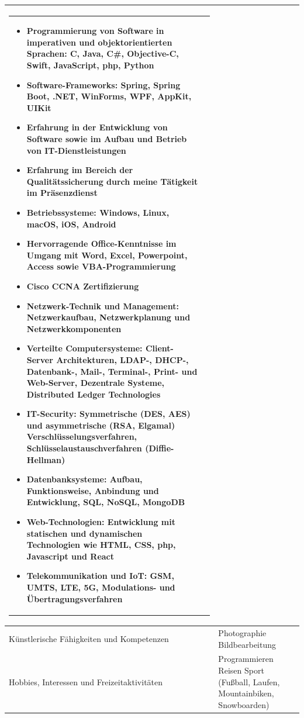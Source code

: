 \begin{longtable}{p{}|p{}}
\begin{tabular} {m{} m{} }
	\begin{itemize}[nosep,leftmargin=1em]
	\item Programmierung von Software in imperativen und objektorientierten Sprachen: C, Java, C\#, Objective-C, Swift, JavaScript, php, Python
	\item Software-Frameworks: Spring, Spring Boot, .NET, WinForms, WPF, AppKit, UIKit
	\item Erfahrung in der Entwicklung von Software sowie im Aufbau und Betrieb von IT-Dienstleistungen
	\item Erfahrung im Bereich der Qualitätssicherung durch meine Tätigkeit im Präsenzdienst
	\item Betriebssysteme: Windows, Linux, macOS, iOS, Android
	\item Hervorragende Office-Kenntnisse im Umgang mit Word, Excel, Powerpoint, Access sowie VBA-Programmierung
	\item Cisco CCNA Zertifizierung
	\item Netzwerk-Technik und Management: Netzwerkaufbau, Netzwerkplanung und Netzwerkkomponenten
	\item Verteilte Computersysteme: Client-Server Architekturen, LDAP-, DHCP-, Datenbank-, Mail-, Terminal-, Print- und Web-Server, Dezentrale Systeme, Distributed Ledger Technologies
	\item IT-Security: Symmetrische (DES, AES) und asymmetrische (RSA, Elgamal) Verschlüsselungsverfahren, Schlüsselaustauschverfahren (Diffie-Hellman)
	\item Datenbanksysteme: Aufbau, Funktionsweise, Anbindung und Entwicklung, SQL, NoSQL, MongoDB
	\item Web-Technologien: Entwicklung mit statischen und dynamischen Technologien wie HTML, CSS, php, Javascript und React
	\item Telekommunikation und IoT: GSM, UMTS, LTE, 5G, Modulations- und Übertragungsverfahren %
	\end{itemize}
	\end{tabular}
	\\
	\bottomrule
	Künstlerische Fähigkeiten und Kompetenzen &
	\tabitem Photographie \newline
	\tabitem Bildbearbeitung \\ \bottomrule
	Hobbies, Interessen und Freizeitaktivitäten &
	\tabitem Programmieren \newline
	\tabitem Reisen \newline
	\tabitem Sport (Fußball, Laufen, Mountainbiken, Snowboarden) \newline

\end{longtable}

